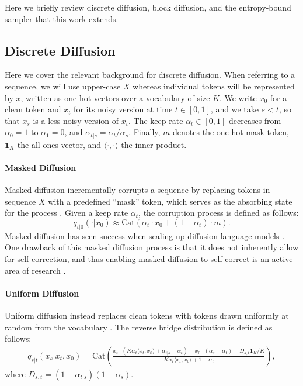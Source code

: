 Here we briefly review discrete diffusion, block diffusion, and the entropy-bound sampler that this work extends.
\subsection{Discrete Diffusion}
Here we cover the relevant background for discrete diffusion. 
When referring to a sequence, we will use upper-case $X$ whereas individual tokens will be represented by $x$, written as one-hot vectors over a vocabulary of size $K$.
We write $x_0$ for a clean token and $x_t$ for its noisy version at time $t \in [0, 1]$, and we take $s < t$, so that $x_s$ is a less noisy version of $x_t$.
The keep rate $\alpha_t \in [0, 1]$ decreases from $\alpha_0 = 1$ to $\alpha_1 = 0$, and $\alpha_{t|s} = \alpha_t / \alpha_s$.
Finally, $m$ denotes the one-hot mask token, $\mathbf{1}_K$ the all-ones vector, and $\langle \cdot, \cdot \rangle$ the inner product.

\paragraph{Masked Diffusion}
Masked diffusion incrementally corrupts a sequence by replacing tokens in sequence $X$ with a predefined ``mask'' token, which serves as the absorbing state for the process \citep{campbell2022continuous, sahoo2024simple, shi2024simplified}.
Given a keep rate $\alpha_t$, the corruption process is defined as follows: 
\[
q_{t|0}(\cdot | x_0) \approx \text{Cat} \left( \alpha_t \cdot x_0 + (1 - \alpha_t) \cdot m\right).
\]
Masked diffusion has seen success when scaling up diffusion language models \citep{nie2026large, ye2025dream7bdiffusionlarge}.
One drawback of this masked diffusion process is that it does not inherently allow for self correction, and thus enabling masked diffusion to self-correct is an active area of research \citep{kim2025fine}.

\paragraph{Uniform Diffusion}
Uniform diffusion instead replaces clean tokens with tokens drawn uniformly at random from the vocabulary \citep{schiff2025simple, sahoo2025diffusion}.
The reverse bridge distribution is defined as follows: 
\begin{align}
\label{eq:bridge}
    q_{s|t}(x_s | x_t, x_0) = \text{Cat} \left( \frac{x_t \cdot (K\alpha_t \langle x_t, x_0 \rangle + \alpha_{t|s} - \alpha_t) + x_0 \cdot ( \alpha_s - \alpha_t) + D_{s,t} \mathbf{1}_K / K}{K \alpha_t \langle x_t, x_0 \rangle + 1 - \alpha_t} \right),
\end{align}
where $D_{s,t} = (1 - \alpha_{t|s})(1 - \alpha_s)$.

